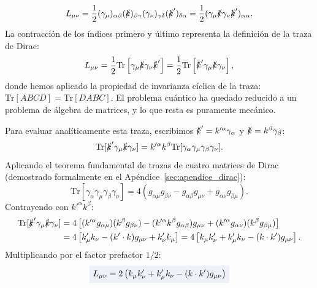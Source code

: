 \documentclass[10pt,a4paper]{article}
\newcommand{\dest}[1]{{\setlength{\fboxsep}{4pt}\colorbox{colordest}{$\displaystyle #1$}}}
\begin{document}
\begin{equation}
L_{\mu\nu} = \frac{1}{2} (\gamma_\mu)_{\alpha\beta} (\slashed{k})_{\beta\gamma} (\gamma_\nu)_{\gamma\delta} (\slashed{k}')_{\delta\alpha} = \frac{1}{2} (\gamma_\mu \slashed{k} \gamma_\nu \slashed{k}')_{\alpha\alpha}.
\end{equation}
La contracción de los índices primero y último representa la definición de la traza de Dirac:
\begin{equation}
L_{\mu\nu} = \frac{1}{2} \text{Tr} \left[ \gamma_\mu \slashed{k} \gamma_\nu \slashed{k}' \right] = \frac{1}{2} \text{Tr} \left[ \slashed{k}' \gamma_\mu \slashed{k} \gamma_\nu \right],
\end{equation}
donde hemos aplicado la propiedad de invarianza cíclica de la traza: $\text{Tr}[A B C D] = \text{Tr}[D A B C]$. El problema cuántico ha quedado reducido a un problema de álgebra de matrices, y lo que resta es puramente mecánico.

Para evaluar analíticamente esta traza, escribimos $\slashed{k}' = k'^\alpha \gamma_\alpha$ y $\slashed{k} = k^\beta \gamma_\beta$:
\begin{equation}
\text{Tr}[\slashed{k}' \gamma_\mu \slashed{k} \gamma_\nu] = k'^\alpha k^\beta \text{Tr}[\gamma_\alpha \gamma_\mu \gamma_\beta \gamma_\nu].
\end{equation}
Aplicando el teorema fundamental de trazas de cuatro matrices de Dirac (demostrado formalmente en el Apéndice~\ref{sec:apendice_dirac}):
\begin{equation}
\text{Tr}[\gamma_\alpha \gamma_\mu \gamma_\beta \gamma_\nu] = 4 \left( g_{\alpha\mu} g_{\beta\nu} - g_{\alpha\beta} g_{\mu\nu} + g_{\alpha\nu} g_{\beta\mu} \right).
\end{equation}
Contrayendo con $k'^\alpha k^\beta$:
\begin{align}
\text{Tr}[\slashed{k}' \gamma_\mu \slashed{k} \gamma_\nu] &= 4 \left[ (k'^\alpha g_{\alpha\mu})(k^\beta g_{\beta\nu}) - (k'^\alpha k^\beta g_{\alpha\beta}) g_{\mu\nu} + (k'^\alpha g_{\alpha\nu})(k^\beta g_{\beta\mu}) \right] \nonumber \\
&= 4 \left[ k'_\mu k_\nu - (k' \cdot k) g_{\mu\nu} + k'_\nu k_\mu \right] = 4 \left[ k_\mu k'_\nu + k'_\mu k_\nu - (k \cdot k') g_{\mu\nu} \right].
\end{align}
Multiplicando por el factor prefactor $1/2$:
\begin{equation}
\dest{L_{\mu\nu} = 2 \left( k_\mu k'_\nu + k'_\mu k_\nu - (k \cdot k') g_{\mu\nu} \right)}
\label{eq:L_munu_exact}
\end{equation}
\end{document}
